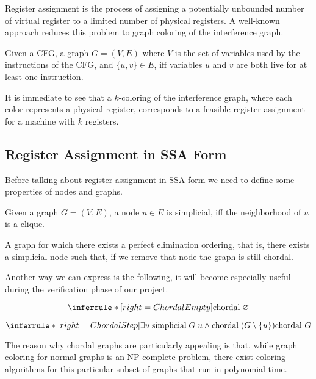 Register assignment is the process of assigning a potentially unbounded number of virtual register to a limited number of physical registers. A well-known approach reduces this problem to graph coloring of the interference graph.

\begin{definition}\label{def:ig}
    Given a CFG, a graph $G = (V, E)$ where $V$ is the set of variables used by the instructions of the CFG, and $\{ u, v \} \in E$, iff variables $u$ and $v$ are both live for at least one instruction.
\end{definition}

It is immediate to see that a $k$-coloring of the interference graph, where each color represents a physical register, corresponds to a feasible register assignment for a machine with $k$ registers.

\subsection{Register Assignment in SSA Form}
\label{subsec:ssara}

Before talking about register assignment in SSA form we need to define some properties of nodes and graphs.

\begin{definition}\label{def:simplicial}
    Given a graph $G = (V, E)$, a node $u \in E$ is simplicial, iff the neighborhood of $u$ is a clique.
\end{definition}

\begin{definition}\label{def:chordal}
    A graph for which there exists a perfect elimination ordering, that is, there exists a simplicial node such that, if we remove that node the graph is still chordal.
\end{definition}

Another way we can express  is the following, it will become especially useful during the verification phase of our project.

\[
\inferrule*[right=ChordalEmpty]{
}{
    \text{chordal} \; \varnothing
}
\]

\[
\inferrule*[right=ChordalStep]{
    \exists u \; \text{simplicial} \; G \; u \land
    \text{chordal} \; (G \setminus \{ u \})
}{
    \text{chordal } G
}
\]

The reason why chordal graphs are particularly appealing is that, while graph coloring for normal graphs is an NP-complete problem, there exist coloring algorithms for this particular subset of graphs that run in polynomial time.

